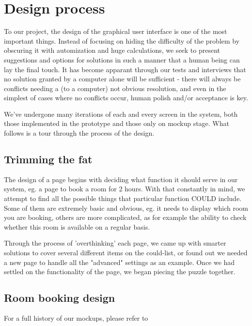 \section{Design process}
\label{sec:design_process}
To our project, the design of the graphical user interface is one of the most important things. Instead of focusing on hiding the difficulty of the problem by obscuring it with automization and huge calculations, we seek to present suggestions and options for solutions in such a manner that a human being can lay the final touch. It has become apparant through our tests and interviews that no solution granted by a computer alone will be sufficient - there will always be conflicts needing a (to a computer) not obvious resolution, and even in the simplest of cases where no conflicts occur, human polish and/or acceptance is key.

We've undergone many iterations of each and every screen in the system, both those implemented in the prototype and those only on mockup stage. What follows is a tour through the process of the design.



\subsection{Trimming the fat}
The design of a page begins with deciding what function it should serve in our system, eg. a page to book a room for 2 hours. With that constantly in mind, we attempt to find all the possible things that particular function COULD include. Some of them are extremely basic and obvious, eg. it needs to display which room you are booking, others are more complicated, as for example the ability to check whether this room is available on a regular basis.

Through the process of 'overthinking' each page, we came up with smarter solutions to cover several different items on the could-list, or found out we needed a new page to handle all the "advanced" settings as an example. Once we had settled on the functionality of the page, we began piecing the puzzle together.



\subsection{Room booking design}
For a full history of our mockups, please refer to %


